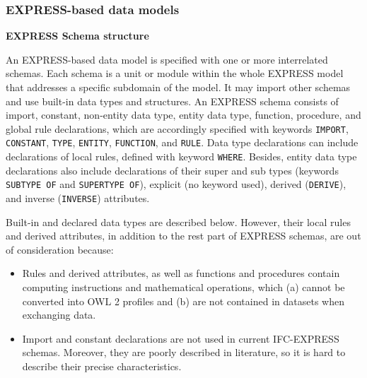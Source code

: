 \subsubsection{EXPRESS-based data models}\label{sec:express-based-data-models}

\noindent\textbf{EXPRESS Schema structure}

An EXPRESS-based data model is specified with one or more interrelated schemas.
Each schema is a unit or module within the whole EXPRESS model that addresses a specific subdomain of the model.
It may import other schemas and use built-in data types and structures.
An EXPRESS schema consists of import, constant, non-entity data type, entity data type, function, procedure, and global rule declarations, which are accordingly specified with keywords \texttt{IMPORT}, \texttt{CONSTANT}, \texttt{TYPE}, \texttt{ENTITY}, \texttt{FUNCTION}, and \texttt{RULE}.
Data type declarations can include declarations of local rules, defined with keyword \texttt{WHERE}.
Besides, entity data type declarations also include declarations of their super and sub types (keywords \texttt{SUBTYPE OF} and \texttt{SUPERTYPE OF}), explicit (no keyword used), derived (\texttt{DERIVE}), and inverse (\texttt{INVERSE}) attributes.

Built-in and declared data types are described below.
However, their local rules and derived attributes, in addition to the rest part of EXPRESS schemas, are out of consideration because:
\begin{itemize}
    \item Rules and derived attributes, as well as functions and procedures contain computing instructions and mathematical operations, which (a) cannot be converted into OWL 2 profiles and (b) are not contained in datasets when exchanging data.
    \item Import and constant declarations are not used in current IFC-EXPRESS schemas. Moreover, they are poorly described in literature, so it is hard to describe their precise characteristics.
\end{itemize}





